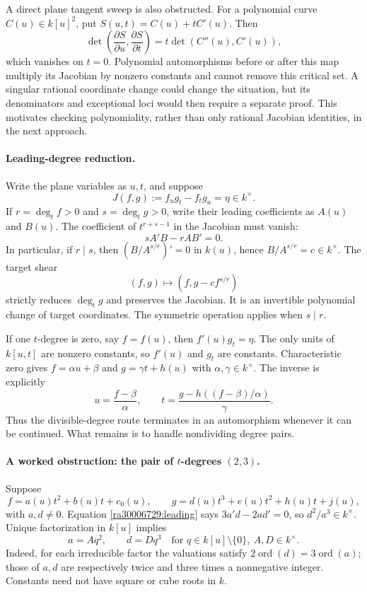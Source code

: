 \documentclass[11pt]{article}
\begin{document}
A direct plane tangent sweep is also obstructed. For a polynomial curve
$C(u)\in k[u]^2$, put $S(u,t)=C(u)+tC'(u)$. Then
\[
 \det\left(\frac{\partial S}{\partial u},
           \frac{\partial S}{\partial t}\right)
     =t\det(C''(u),C'(u)),
\]
which vanishes on $t=0$. Polynomial automorphisms before or after this map
multiply its Jacobian by nonzero constants and cannot remove this critical
set. A singular rational coordinate change could change the situation, but
its denominators and exceptional loci would then require a separate proof.
This motivates checking polynomiality, rather than only rational Jacobian
identities, in the next approach.

\paragraph{Leading-degree reduction.}
Write the plane variables as $u,t$, and suppose
\[
 J(f,g):=f_u g_t-f_t g_u=\eta\in k^\times.
\]
If $r=\deg_t f>0$ and $s=\deg_t g>0$, write their leading coefficients as
$A(u)$ and $B(u)$. The coefficient of $t^{r+s-1}$ in the Jacobian must vanish:
\begin{equation}\label{ra30006729:leading}
 sA'B-rAB'=0.
\end{equation}
In particular, if $r\mid s$, then
$(B/A^{s/r})'=0$ in $k(u)$, hence $B/A^{s/r}=c\in k^\times$.
The target shear
\begin{equation}\label{ra30006729:shear}
 (f,g)\longmapsto(f,g-cf^{s/r})
\end{equation}
strictly reduces $\deg_t g$ and preserves the Jacobian. It is an invertible
polynomial change of target coordinates. The symmetric operation applies
when $s\mid r$.

If one $t$-degree is zero, say $f=f(u)$, then $f'(u)g_t=\eta$. The only
units of $k[u,t]$ are nonzero constants, so $f'(u)$ and $g_t$ are constants.
Characteristic zero gives
$f=\alpha u+\beta$ and $g=\gamma t+h(u)$ with
$\alpha,\gamma\in k^\times$. The inverse is explicitly
\[
 u=\frac{f-\beta}{\alpha},\qquad
 t=\frac{g-h((f-\beta)/\alpha)}{\gamma}.
\]
Thus the divisible-degree route terminates in an automorphism whenever it
can be continued. What remains is to handle nondividing degree pairs.

\paragraph{A worked obstruction: the pair of $t$-degrees $(2,3)$.}
Suppose
\[
 f=a(u)t^2+b(u)t+c_0(u),\qquad
 g=d(u)t^3+e(u)t^2+h(u)t+j(u),
\]
with $a,d\ne0$. Equation \eqref{ra30006729:leading} says $3a'd-2ad'=0$,
so $d^2/a^3\in k^\times$. Unique factorization in $k[u]$ implies
\[
 a=Aq^2,\qquad d=Dq^3
 \quad\text{for }q\in k[u]\setminus\{0\},\ A,D\in k^\times.
\]
Indeed, for each irreducible factor the valuations satisfy
$2\operatorname{ord}(d)=3\operatorname{ord}(a)$; those of $a,d$ are
respectively twice and three times a nonnegative integer. Constants need
not have square or cube roots in $k$.
\end{document}
